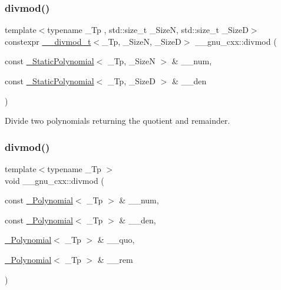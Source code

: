 \subsubsection{\texorpdfstring{divmod()}{divmod()}\hspace{0.1cm}{\footnotesize\ttfamily [1/2]}}
{\footnotesize\ttfamily template$<$typename \+\_\+\+Tp , std\+::size\+\_\+t \+\_\+\+SizeN, std\+::size\+\_\+t \+\_\+\+SizeD$>$ \\
constexpr \hyperlink{struct____gnu__cxx_1_1____divmod__t}{\+\_\+\+\_\+divmod\+\_\+t}$<$\+\_\+\+Tp, \+\_\+\+SizeN, \+\_\+\+SizeD$>$ \+\_\+\+\_\+gnu\+\_\+cxx\+::divmod (\begin{DoxyParamCaption}\item[{const \hyperlink{class____gnu__cxx_1_1__StaticPolynomial}{\+\_\+\+Static\+Polynomial}$<$ \+\_\+\+Tp, \+\_\+\+SizeN $>$ \&}]{\+\_\+\+\_\+num,  }\item[{const \hyperlink{class____gnu__cxx_1_1__StaticPolynomial}{\+\_\+\+Static\+Polynomial}$<$ \+\_\+\+Tp, \+\_\+\+SizeD $>$ \&}]{\+\_\+\+\_\+den }\end{DoxyParamCaption})}

Divide two polynomials returning the quotient and remainder. \mbox{\label{namespace____gnu__cxx_a84c52dc7c40b8b2731425e93db52903d}} 
\subsubsection{\texorpdfstring{divmod()}{divmod()}\hspace{0.1cm}{\footnotesize\ttfamily [2/2]}}
{\footnotesize\ttfamily template$<$typename \+\_\+\+Tp $>$ \\
void \+\_\+\+\_\+gnu\+\_\+cxx\+::divmod (\begin{DoxyParamCaption}\item[{const \hyperlink{class____gnu__cxx_1_1__Polynomial}{\+\_\+\+Polynomial}$<$ \+\_\+\+Tp $>$ \&}]{\+\_\+\+\_\+num,  }\item[{const \hyperlink{class____gnu__cxx_1_1__Polynomial}{\+\_\+\+Polynomial}$<$ \+\_\+\+Tp $>$ \&}]{\+\_\+\+\_\+den,  }\item[{\hyperlink{class____gnu__cxx_1_1__Polynomial}{\+\_\+\+Polynomial}$<$ \+\_\+\+Tp $>$ \&}]{\+\_\+\+\_\+quo,  }\item[{\hyperlink{class____gnu__cxx_1_1__Polynomial}{\+\_\+\+Polynomial}$<$ \+\_\+\+Tp $>$ \&}]{\+\_\+\+\_\+rem }\end{DoxyParamCaption})}

